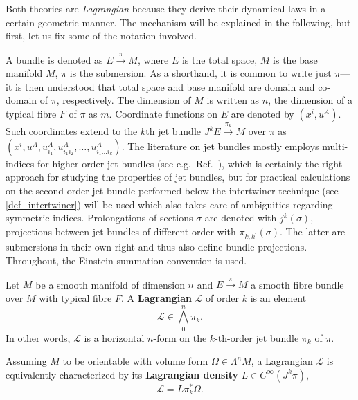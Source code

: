 Both theories are \emph{Lagrangian} because they derive their dynamical laws in a certain geometric manner. The mechanism will be explained in the following, but first, let us fix some of the notation involved.

A bundle is denoted as $E\overset{\pi}{\longrightarrow}M$, where $E$ is the total space, $M$ is the base manifold $M$, $\pi$ is the submersion. As a shorthand, it is common to write just $\pi$---it is then understood that total space and base manifold are domain and co-domain of $\pi$, respectively. The dimension of $M$ is written as $n$, the dimension of a typical fibre $F$ of $\pi$ as $m$. Coordinate functions on $E$ are denoted by $(x^i,u^A)$. Such coordinates extend to the $k$th jet bundle $J^kE \overset{\pi_k}{\longrightarrow}M$ over $\pi$ as $(x^i,\allowbreak u^A,\allowbreak u^A_{i_1},\allowbreak u^A_{i_1i_2},\allowbreak \dots,\allowbreak u^A_{i_1\dots i_k})$. The literature on jet bundles mostly employs multi-indices for higher-order jet bundles (see e.g.~Ref.~\cite{saunders}), which is certainly the right approach for studying the properties of jet bundles, but for practical calculations on the second-order jet bundle performed below the intertwiner technique (see \ref{def_intertwiner}) will be used which also takes care of ambiguities regarding symmetric indices. Prolongations of sections $\sigma$ are denoted with $j^k(\sigma)$, projections between jet bundles of different order with $\pi_{k,k^\prime}(\sigma)$. The latter are submersions in their own right and thus also define bundle projections. Throughout, the Einstein summation convention is used.

\begin{definition}[Lagrangian]
  Let $M$ be a smooth manifold of dimension $n$ and $E \overset{\pi}{\longrightarrow} M$ a smooth fibre bundle over $M$ with typical fibre $F$. A \textbf{Lagrangian} $\mathcal L$ of order $k$ is an element
  \begin{equation}
    \mathcal L \in \textstyle\bigwedge^n_0\pi_k.
  \end{equation}
In other words, $\mathcal L$ is a horizontal $n$-form on the $k$-th-order jet bundle $\pi_k$ of $\pi$.

Assuming $M$ to be orientable with volume form $\Omega\in\Lambda^nM$, a Lagrangian $\mathcal L$ is equivalently characterized by its \textbf{Lagrangian density} $L\in C^\infty(J^k\pi)$,
  \begin{equation}\label{lagrangian_density}
  \mathcal L = L\pi_k^\ast\Omega.
\end{equation}
\end{definition}


